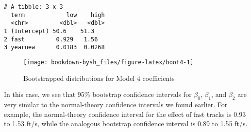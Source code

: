 \documentclass[
]{krantz}
\newenvironment{Shaded}{\begin{snugshade}}{\end{snugshade}}
\newcommand{\CommentTok}[1]{\textcolor[rgb]{0.37,0.37,0.37}{\textit{#1}}}
\newcommand{\DataTypeTok}[1]{\textcolor[rgb]{0.27,0.27,0.27}{#1}}
\newcommand{\DecValTok}[1]{\textcolor[rgb]{0.06,0.06,0.06}{#1}}
\newcommand{\FloatTok}[1]{\textcolor[rgb]{0.06,0.06,0.06}{#1}}
\newcommand{\KeywordTok}[1]{\textcolor[rgb]{0.27,0.27,0.27}{\textbf{#1}}}
\newcommand{\NormalTok}[1]{#1}
\newcommand{\OperatorTok}[1]{\textcolor[rgb]{0.43,0.43,0.43}{\textbf{#1}}}
\newcommand{\StringTok}[1]{\textcolor[rgb]{0.5,0.5,0.5}{#1}}
\begin{document}
\begin{Shaded}
\end{Shaded}

\begin{verbatim}
# A tibble: 3 x 3
  term            low    high
  <chr>         <dbl>   <dbl>
1 (Intercept) 50.6    51.3   
2 fast         0.929   1.56  
3 yearnew      0.0183  0.0268
\end{verbatim}

\begin{figure}

{\centering \texttt{[image: bookdown-bysh\_files/figure-latex/boot4-1]} 

}

\caption{Bootstrapped distributions for Model 4 coefficients}\label{fig:boot4}
\end{figure}

In this case, we see that 95\% bootstrap confidence intervals for \(\beta_0\), \(\beta_1\), and \(\beta_2\) are very similar to the normal-theory confidence intervals we found earlier. For example, the normal-theory confidence interval for the effect of fast tracks is 0.93 to 1.53 ft/s, while the analogous bootstrap confidence interval is 0.89 to 1.55 ft/s.
\end{document}
